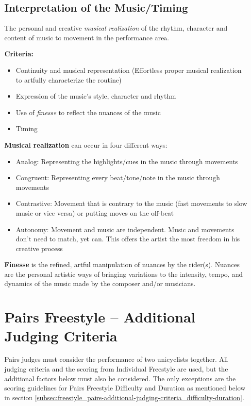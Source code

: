 \subsection{Interpretation of the Music/Timing}
The personal and creative \emph{musical realization} of the rhythm, character and content of music to movement in the performance area.

\textbf{Criteria:}
\begin{itemize}
\item Continuity and musical representation (Effortless proper musical realization to artfully characterize the routine)
\item Expression of the music's style, character and rhythm
\item Use of \emph{finesse} to reflect the nuances of the music
\item Timing
\end{itemize}

\textbf{Musical realization} can occur in four different ways:
\begin{itemize}
\item Analog: Representing the highlights/cues in the music through movements
\item Congruent: Representing every beat/tone/note in the music through movements
\item Contrastive: Movement that is contrary to the music (fast movements to slow music or vice versa) or putting moves on the off-beat
\item Autonomy: Movement and music are independent. Music and movements don't need to match, yet can. This offers the artist the most freedom in his creative process
\end{itemize}

\textbf{Finesse} is the refined, artful manipulation of nuances by the rider(s). Nuances are the personal artistic ways of bringing variations to the intensity, tempo, and dynamics of the music made by the composer and/or musicians.

\section{Pairs Freestyle -- Additional Judging Criteria}
Pairs judges must consider the performance of two unicyclists together.
All judging criteria and the scoring from Individual Freestyle are used, but the additional factors below must also be considered.
The only exceptions are the scoring guidelines for Pairs Freestyle Difficulty and Duration as mentioned below in section \ref{subsec:freestyle_pairs-additional-judging-criteria_difficulty-duration}.

